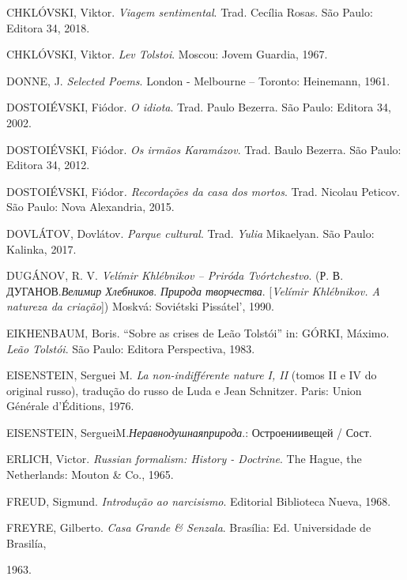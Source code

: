 CHKLÓVSKI, Viktor. \emph{Viagem sentimental}. Trad. Cecília Rosas. São
Paulo: Editora 34, 2018.

CHKLÓVSKI, Viktor. \emph{Lev Tolstoi}. Moscou: Jovem Guardia, 1967.

DONNE, J. \emph{Selected Poems}. London - Melbourne -- Toronto:
Heinemann, 1961.

DOSTOIÉVSKI, Fiódor. \emph{O idiota}. Trad. Paulo Bezerra. São Paulo:
Editora 34, 2002.

DOSTOIÉVSKI, Fiódor. \emph{Os irmãos Karamázov}. Trad. Baulo Bezerra.
São Paulo: Editora 34, 2012.

DOSTOIÉVSKI, Fiódor\emph{. Recordações da casa dos mortos}. Trad.
Nicolau Peticov. São Paulo: Nova Alexandria, 2015.

DOVLÁTOV, Dovlátov. \emph{Parque cultural}. Trad.
\emph{Yulia} Mikaelyan. São Paulo: Kalinka, 2017.

DUGÁNOV, R. V. \emph{Velímir Khlébnikov -- Priróda Tvórtchestvo}. (Р. В.
ДУГАНОВ.\emph{Велимир Хлебников}. \emph{Природа творчества}.
{[}\emph{Velímir Khlébnikov. A natureza da criação}{]}) Moskvá:
Soviétski Pissátel', 1990.

EIKHENBAUM, Boris. ``Sobre as crises de Leão Tolstói'' in: GÓRKI,
Máximo. \emph{Leão Tolstói}. São Paulo: Editora Perspectiva, 1983.

EISENSTEIN, Serguei M. \emph{La non-indifférente nature I, II} (tomos II
e IV do original russo), tradução do russo de Luda e Jean Schnitzer.
Paris: Union Générale d'Éditions, 1976.

EISENSTEIN, SergueiM.\emph{Неравнодушнаяприрода}.: Остроениивещей /
Сост.

ERLICH, Victor. \emph{Russian formalism: History - Doctrine}. The Hague,
the Netherlands: Mouton \& Co., 1965.

FREUD, Sigmund. \emph{Introdução ao narcisismo}. Editorial Biblioteca
Nueva, 1968.

FREYRE, Gilberto. \emph{Casa Grande \& Senzala}. Brasília: Ed.
Universidade de Brasilía,

1963.

